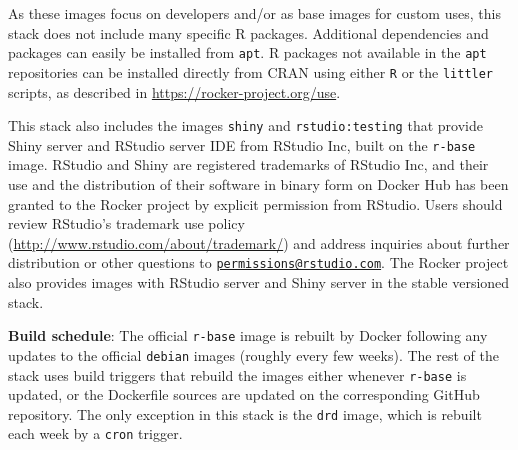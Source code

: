 As these images focus on developers and/or as base images for custom
uses, this stack does not include many specific R packages. Additional
dependencies and packages can easily be installed from \texttt{apt}. R
packages not available in the \texttt{apt} repositories can be installed
directly from CRAN using either \texttt{R} or the \texttt{littler}
scripts, as described in \url{https://rocker-project.org/use}.

This stack also includes the images \texttt{shiny} and
\texttt{rstudio:testing} that provide Shiny server and
RStudio\textsuperscript{\textregistered} server IDE from
RStudio\textsuperscript{\textregistered} Inc, built on the
\texttt{r-base} image. RStudio\textsuperscript{\textregistered} and
Shiny are registered trademarks of RStudio Inc, and their use and the
distribution of their software in binary form on Docker Hub has been
granted to the Rocker project by explicit permission from RStudio. Users
should review RStudio\textsuperscript{\textregistered}'s trademark use
policy (\url{http://www.rstudio.com/about/trademark/}) and address
inquiries about further distribution or other questions to
\href{mailto:permissions@rstudio.com}{\nolinkurl{permissions@rstudio.com}}.
The Rocker project also provides images with
RStudio\textsuperscript{\textregistered} server and Shiny server in the
stable versioned stack.

\textbf{Build schedule}: The official \texttt{r-base} image is rebuilt
by Docker following any updates to the official \texttt{debian} images
(roughly every few weeks). The rest of the stack uses build triggers
that rebuild the images either whenever \texttt{r-base} is updated, or
the Dockerfile sources are updated on the corresponding GitHub
repository. The only exception in this stack is the \texttt{drd} image,
which is rebuilt each week by a \texttt{cron} trigger.

